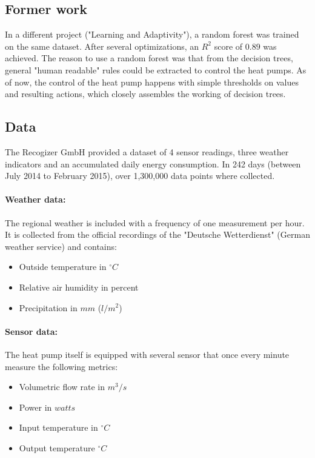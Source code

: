 \documentclass[conference]{IEEEtran}
\begin{document}
\subsection{Former work}
\label{sec:formerwork}
In a different project ("Learning and Adaptivity"), a random forest was trained on the same dataset. After several optimizations, an $R^{2}$ score of $0.89$ was achieved. The reason to use a random forest was that from the decision trees, general "human readable" rules could be extracted to control the heat pumps. As of now, the control of the heat pump happens with simple thresholds on values and resulting actions, which closely assembles the working of decision trees.


\subsection{Data} 
\label{sec:data}
The Recogizer GmbH provided a dataset of 4 sensor readings, three weather indicators and an accumulated daily energy consumption. In 242 days (between July 2014 to February 2015), over 1,300,000 data points where collected.

\paragraph{Weather data:}
The regional weather is included with a frequency of one measurement per hour. It is collected from the official recordings of the "Deutsche Wetterdienst" (German weather service) and contains:

\begin{itemize}
	\item Outside temperature in $^\circ C$
	\item Relative air humidity in percent
	\item Precipitation in $mm$ ($l/m^{2}$)
\end{itemize}


\paragraph{Sensor data:}
The heat pump itself is equipped with several sensor that once every minute measure the following metrics:
\begin{itemize}
	\item Volumetric flow rate in $m^3 / s$
	\item Power in $watts$
	\item Input temperature in $^\circ C$
	\item Output temperature $^\circ C$
\end{itemize}
\end{document}
